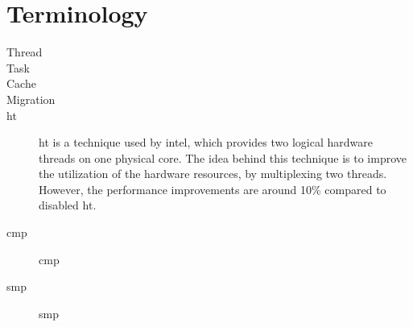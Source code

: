 \section{Terminology}
\label{state:term}


\begin{description}
  \item[Thread]
  \item[Task]
  \item[Cache]
  \item[Migration]
  \item[\gls{ht}] \gls{ht} is a technique used by \gls{intel}, which provides
    two logical hardware threads on one physical core.
    The idea behind this technique is to improve the utilization of the
    hardware resources, by multiplexing two threads.
    However, the performance improvements are around 10\% compared to disabled
    \gls{ht}.
  \item[\gls{cmp}] \gls{cmp}
  \item[\gls{smp}] \gls{smp}
\end{description}
